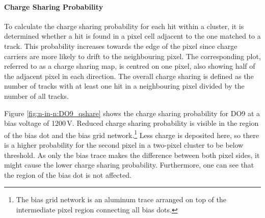 \paragraph{Charge Sharing Probability}

To calculate the charge sharing probability for each hit within a cluster, it is determined whether a hit is found in a pixel cell adjacent to the one matched to a track.
This probability increases towards the edge of the pixel since charge carriers are more likely to drift to the neighbouring pixel. The corresponding plot, referred to as a charge sharing map, is centred on one pixel, also showing half of the adjacent pixel in each direction.
The overall charge sharing is defined as the number of tracks with at least one hit in a neighbouring pixel divided by the number of all tracks.

Figure \ref{fig:n-in-n:DO9_qshare} shows the charge sharing probability for DO9 at a bias voltage of 1200\,V.
Reduced charge sharing probability is visible in the region of the bias dot
 and the bias grid network.\footnote{The bias grid network is an aluminum trace
 arranged on top of the intermediate pixel region connecting all bias dots.}
 Less charge is deposited here, so there is a higher probability for the second pixel in a two-pixel cluster to be below threshold.
As only the bias trace makes the difference between both pixel sides, it might cause the lower charge sharing probability. Furthermore, one can see that the region of the bias dot is not affected.


